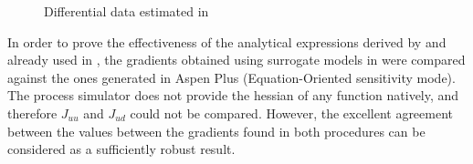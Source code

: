 \documentclass[../../msc-thesis.tex]{subfiles}
\begin{document}
\begin{figure}[htb]
	\centering
	\caption{Differential data estimated in \mtc}
	\label{fig:diffdataresults}
\end{figure}

In order to prove the effectiveness of the analytical expressions derived by 
\textcite{Lophaven2002} and already used in \textcite{Alves2018}, the 
gradients obtained using surrogate models in \mtc were compared against 
the ones generated in Aspen Plus (Equation-Oriented sensitivity mode). 
The process simulator does not provide the hessian of any function natively, 
and therefore $J_{uu}$ and $J_{ud}$  could not be compared. However, the 
excellent agreement between the values between the gradients found in both 
procedures can be considered as a sufficiently robust result.
\end{document}
